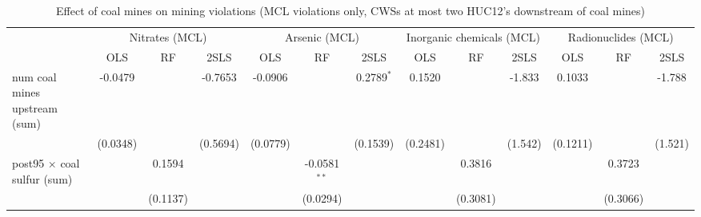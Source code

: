 
\begin{table}[htbp]
   
   \caption{\label{2sls_dwnstrm2step_minevio_mcl_ivsum} Effect of coal mines on mining violations (MCL violations only, CWSs at most two HUC12's downstream of coal mines)}
   \bigskip
   
   \centering
   
   \begin{adjustbox}{width = \textwidth, center}
      
      
      \begin{tabular}{lcccccccccccc}
         \toprule
         
          & \multicolumn{3}{c}{Nitrates (MCL)} & \multicolumn{3}{c}{Arsenic (MCL)} & \multicolumn{3}{c}{Inorganic chemicals (MCL)} & \multicolumn{3}{c}{Radionuclides (MCL)}\\
         
                                                                            & OLS           & RF            & 2SLS          & OLS           & RF             & 2SLS          & OLS           & RF            & 2SLS          & OLS           & RF            & 2SLS\\  
         
         \midrule 
         num coal mines upstream (sum)                                      & -0.0479       &               & -0.7653       & -0.0906       &                & 0.2789$^{*}$  & 0.1520        &               & -1.833        & 0.1033        &               & -1.788\\   
                                                                            & (0.0348)      &               & (0.5694)      & (0.0779)      &                & (0.1539)      & (0.2481)      &               & (1.542)       & (0.1211)      &               & (1.521)\\   
         post95 $\times$ coal sulfur (sum)                                  &               & 0.1594        &               &               & -0.0581$^{**}$ &               &               & 0.3816        &               &               & 0.3723        &   \\   
                                                                            &               & (0.1137)      &               &               & (0.0294)       &               &               & (0.3081)      &               &               & (0.3066)      &   \\   
         

\end{tabular}
\end{adjustbox}
\end{table}
